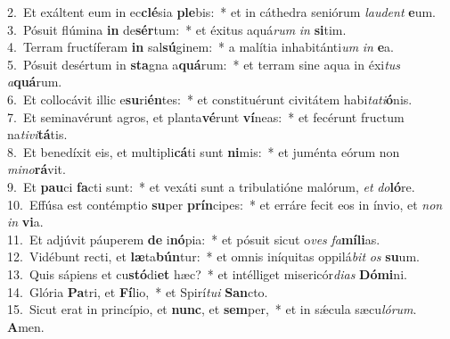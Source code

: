 {2.~}Et exáltent eum in ec\textbf{clé}sia \textbf{ple}bis:~* et in cáthedra seniórum \textit{lau}\textit{dent} \textbf{e}um.\\
{3.~}Pósuit flúmina \textbf{in} de\textbf{sér}tum:~* et éxitus aquá\textit{rum} \textit{in} \textbf{si}tim.\\
{4.~}Terram fructíferam \textbf{in} sal\textbf{sú}ginem:~* a malítia inhabitánti\textit{um} \textit{in} \textbf{e}a.\\
{5.~}Pósuit desértum in \textbf{sta}gna a\textbf{quá}rum:~* et terram sine aqua in éxi\textit{tus} \textit{a}\textbf{quá}rum.\\
{6.~}Et collocávit illic e\textbf{su}ri\textbf{én}tes:~* et constituérunt civitátem habi\textit{ta}\textit{ti}\textbf{ó}nis.\\
{7.~}Et seminavérunt agros, et planta\textbf{vé}runt \textbf{ví}neas:~* et fecérunt fructum na\textit{ti}\textit{vi}\textbf{tá}tis.\\
{8.~}Et benedíxit eis, et multipli\textbf{cá}ti sunt \textbf{ni}mis:~* et juménta eórum non \textit{mi}\textit{no}\textbf{rá}vit.\\
{9.~}Et \textbf{pau}ci \textbf{fa}cti sunt:~* et vexáti sunt a tribulatióne malórum, \textit{et} \textit{do}\textbf{ló}re.\\
{10.~}Effúsa est contémptio \textbf{su}per \textbf{prín}cipes:~* et erráre fecit eos in ínvio, et \textit{non} \textit{in} \textbf{vi}a.\\
{11.~}Et adjúvit páuperem \textbf{de} i\textbf{nó}pia:~* et pósuit sicut o\textit{ves} \textit{fa}\textbf{mí}\textbf{li}as.\\
{12.~}Vidébunt recti, et \textbf{læ}ta\textbf{bún}tur:~* et omnis iníquitas oppilá\textit{bit} \textit{os} \textbf{su}um.\\
{13.~}Quis sápiens et cu\textbf{stó}di\textbf{et} hæc?~* et intélliget misericór\textit{di}\textit{as} \textbf{Dó}\textbf{mi}ni.\\
{14.~}Glória \textbf{Pa}tri, et \textbf{Fí}lio,~* et Spirí\textit{tu}\textit{i} \textbf{San}cto.\\
{15.~}Sicut erat in princípio, et \textbf{nunc}, et \textbf{sem}per,~* et in sǽcula sæcu\textit{ló}\textit{rum}. \textbf{A}men.\\
